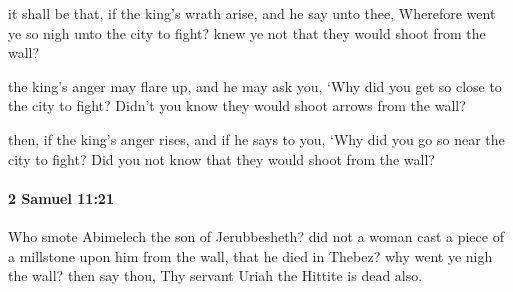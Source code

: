 			\begin{versebox}
					\item[BHS] 
					\item[ASV] it shall be that, if the king's wrath arise, and he say unto thee, Wherefore went ye so nigh unto the city to fight? knew ye not that they would shoot from the wall?
					\item[NIV] the king’s anger may flare up, and he may ask you, ‘Why did you get so close to the city to fight? Didn’t you know they would shoot arrows from the wall?
					\item[NRSV] then, if the king’s anger rises, and if he says to you, ‘Why did you go so near the city to fight? Did you not know that they would shoot from the wall?
			\end{versebox}

		\paragraph{2 Samuel 11:21} %
			\label{2SAMUEL-11-21}

			Who smote Abimelech the son of Jerubbesheth? did not a woman cast a piece of a millstone upon him from the wall, that he died in Thebez? why went ye nigh the wall? then say thou, Thy servant Uriah the Hittite is dead also.

